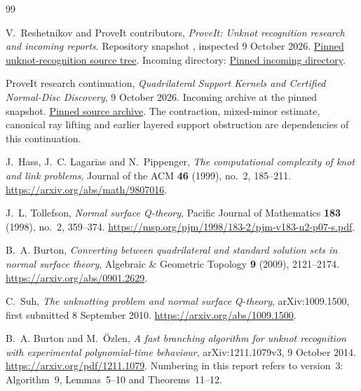 \begin{thebibliography}{99}
\raggedright
{}

V.~Reshetnikov and ProveIt contributors,
\emph{ProveIt: Unknot recognition research and incoming reports}.
Repository snapshot \baseline, inspected 9 October 2026.
\href{https://github.com/VladimirReshetnikov/ProveIt/tree/3a90fb34146c915328ab8eac6250cc2514f74ed0/Topology/UnknotRecognition}{Pinned unknot-recognition source tree}.
Incoming directory:
\href{https://github.com/VladimirReshetnikov/ProveIt/tree/3a90fb34146c915328ab8eac6250cc2514f74ed0/docs/incoming}{Pinned incoming directory}.

ProveIt research continuation,
\emph{Quadrilateral Support Kernels and Certified Normal-Disc Discovery},
9 October 2026. Incoming archive
 at the pinned snapshot.
\href{https://github.com/VladimirReshetnikov/ProveIt/blob/3a90fb34146c915328ab8eac6250cc2514f74ed0/docs/incoming/unknot_quadrilateral_support_kernel_20261009.zip}{Pinned source archive}.
The contraction, mixed-minor estimate, canonical ray lifting and earlier layered support obstruction are dependencies of this continuation.

J.~Hass, J.~C. Lagarias and N.~Pippenger,
\emph{The computational complexity of knot and link problems},
Journal of the ACM \textbf{46} (1999), no.~2, 185--211.
\url{https://arxiv.org/abs/math/9807016}.

J.~L. Tollefson,
\emph{Normal surface Q-theory},
Pacific Journal of Mathematics \textbf{183} (1998), no.~2, 359--374.
\url{https://msp.org/pjm/1998/183-2/pjm-v183-n2-p07-s.pdf}.

B.~A. Burton,
\emph{Converting between quadrilateral and standard solution sets in normal surface theory},
Algebraic \& Geometric Topology \textbf{9} (2009), 2121--2174.
\url{https://arxiv.org/abs/0901.2629}.

C.~Suh,
\emph{The unknotting problem and normal surface Q-theory},
arXiv:1009.1500, first submitted 8 September 2010.
\url{https://arxiv.org/abs/1009.1500}.

B.~A. Burton and M.~\"Ozlen,
\emph{A fast branching algorithm for unknot recognition with experimental polynomial-time behaviour},
arXiv:1211.1079v3, 9 October 2014.
\url{https://arxiv.org/pdf/1211.1079}.
Numbering in this report refers to version~3: Algorithm~9, Lemmas~5--10 and Theorems~11--12.


\end{thebibliography}
